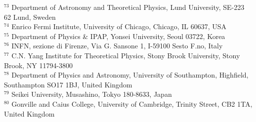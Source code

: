 {$^{73}$ Department of Astronomy and Theoretical Physics, Lund University, SE-223 62 Lund, Sweden \\ 
$^{74}$ Enrico Fermi Institute, University of Chicago, Chicago, IL 60637, USA \\ 
$^{75}$ Department of Physics \& IPAP, Yonsei University, Seoul 03722, Korea \\ 
$^{76}$ INFN, sezione di Firenze, Via G. Sansone 1, I-59100 Sesto F.no, Italy \\ 
$^{77}$ C.N. Yang Institute for Theoretical Physics, Stony Brook University, Stony Brook, NY 11794-3800 \\ 
$^{78}$ Department of Physics and Astronomy, University of Southampton, Highfield, Southampton SO17 1BJ, United Kingdom \\ 
$^{79}$ Seikei University, Musashino, Tokyo 180-8633, Japan \\ 
$^{80}$ Gonville and Caius College, University of Cambridge, Trinity Street, CB2 1TA, United Kingdom \\ 
}

